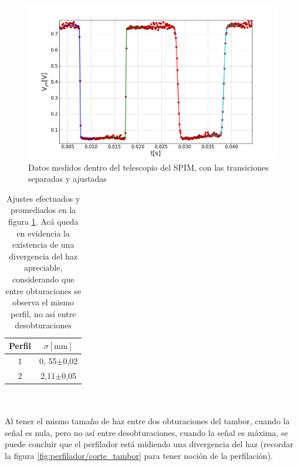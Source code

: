 \begin{minipage}[c]{0.55\textwidth}
\begin{figure}[H]
    \centering
    \includegraphics[width=\textwidth]{fig/perfilador/spim_telescopio}
    \caption{Datos medidos dentro del telescopio del SPIM, con las transiciones separadas y ajustadas}
    \label{fig:perfilador/spim_telescopio}
\end{figure}
\end{minipage}
%
\begin{minipage}[c]{0.35\textwidth}
    \begin{table}[H]
        \centering
        \begin{tabular}{c|c}
            Perfil & $\sigma[\text{mm}]$ \\ \hline
            1 & 0, 55$\pm$0,02  \\
            2 & 2,11$\pm$0,05 \\
        \end{tabular}
        \caption{Ajustes efectuados y promediados en la figura \ref{fig:perfilador/spim_telescopio}. Acá queda en evidencia la existencia de una divergencia del haz apreciable, considerando que entre obturaciones se observa el mismo perfil, no así entre desobturaciones}
        \label{tbl:perfilador/spim_telescopio}
    \end{table}
\end{minipage}
\\ \\

Al tener el mismo tamaño de haz entre dos obturaciones del tambor, cuando la señal es nula, pero no así entre desobturaciones, cuando la señal es máxima, se puede concluir que el perfilador está midiendo una divergencia del haz (recordar la figura \ref{fig:perfilador/corte_tambor} para tener noción de la perfilación).

